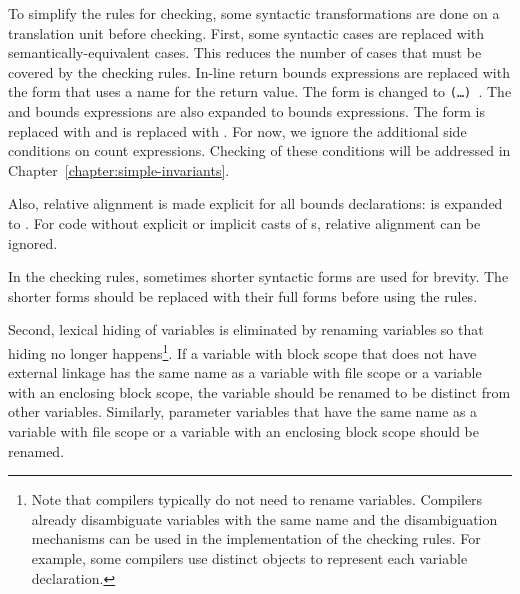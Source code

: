 To simplify the rules for checking, some syntactic transformations are done
on a translation unit before checking.  First, some syntactic cases are
replaced with semantically-equivalent cases.  This reduces the number of cases
that must be covered by the checking rules.  In-line return bounds expressions
are replaced with the form that uses a name for the return value. The form
 is changed to 
\texttt{(\ldots{}) 
  }.
The  and
 bounds expressions are also expanded to bounds expressions.
The form 
is replaced with 
and 
is replaced with .
For now, we ignore the additional side conditions on count expressions. Checking of these
conditions will be addressed in Chapter~\ref{chapter:simple-invariants}.

Also, relative alignment is made explicit for all bounds
declarations:  is expanded to
.
For code without explicit or implicit casts of \arrayptr s, relative
alignment can be ignored.

In the checking rules, sometimes shorter syntactic forms are used for
brevity. The shorter forms should be replaced with their full forms before
using the rules.

Second, lexical hiding of variables is eliminated by renaming variables so that
hiding no longer happens\footnote{Note that compilers typically do not need to
rename variables. Compilers already disambiguate variables with the
same name and the disambiguation mechanisms can be used in the implementation
of the checking rules.  For example, some compilers use distinct objects
to represent each variable declaration.}.  If a variable with block scope that does not
have external linkage has the same name as a variable with file scope or
a variable with an enclosing block scope, the variable
should be renamed to be distinct from other variables.  Similarly, parameter
variables that have the same name as a variable with file scope or a
variable with an enclosing block scope should be renamed.

